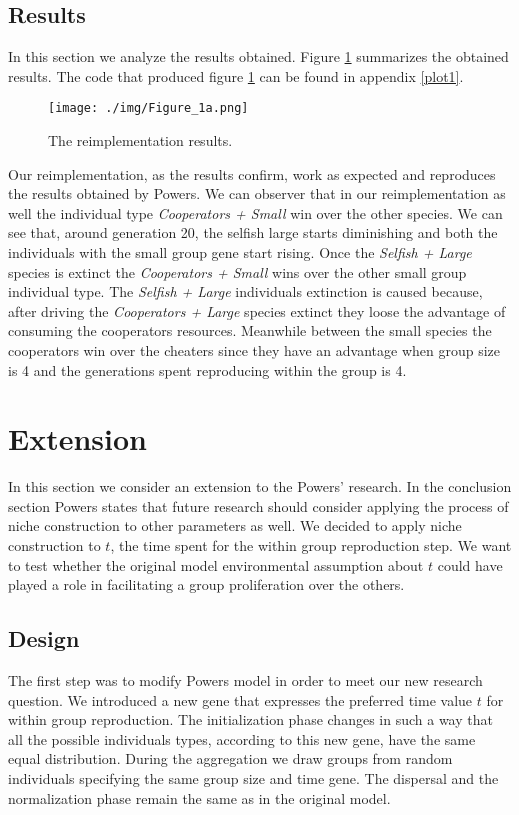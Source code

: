 \documentclass[runningheads]{llncs}
\begin{document}
\subsection{Results}
In this section we analyze the results obtained. Figure \ref{fig1}
summarizes the obtained results. The code that produced figure
\ref{fig1} can be found in appendix \ref{plot1}.
\begin{figure}
\texttt{[image: ./img/Figure\_1a.png]}
\caption{The reimplementation results.} \label{fig1}
\end{figure}
Our reimplementation, as the results confirm, work as expected and
reproduces the results obtained by Powers. We can observer that in our
reimplementation as well the individual type \textit{Cooperators +
  Small} win over the other species. We can see that, around
generation 20, the selfish large starts diminishing and both the
individuals with the small group gene start rising. Once the
\textit{Selfish + Large} species is extinct the \textit{Cooperators +
  Small} wins over the other small group individual type. The
\textit{Selfish + Large} individuals extinction is caused because,
after driving the \textit{Cooperators + Large} species extinct they
loose the advantage of consuming the cooperators resources. Meanwhile
between the small species the cooperators win over the cheaters since
they have an advantage when group size is 4 and the generations spent
reproducing within the group is 4.


\section{Extension}
In this section we consider an extension to the Powers' research. In
the conclusion section Powers states that future research should
consider applying the process of niche construction to other
parameters as well. We decided to apply niche construction to $t$, the
time spent for the within group reproduction step. We want to test
whether the original model environmental assumption about $t$ could
have played a role in facilitating a group proliferation over the
others.

\subsection{Design}
The first step was to modify Powers model in order to meet our new
research question. We introduced a new gene that expresses the
preferred time value $t$ for within group reproduction. The
initialization phase changes in such a way that all the possible
individuals types, according to this new gene, have the same equal
distribution. During the aggregation we draw groups from random
individuals specifying the same group size and time gene. The
dispersal and the normalization phase remain the same as in the
original model.
\end{document}
